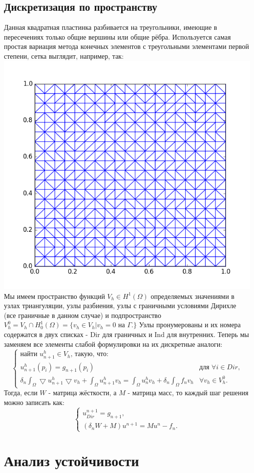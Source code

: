 \documentclass[paper=a4, fontsize=11pt]{scrartcl} %
\numberwithin{equation}{section} %
\numberwithin{figure}{section} %
\numberwithin{table}{section} %
\begin{document}
\subsection{Дискретизация по пространству}
Данная квадратная пластинка разбивается на треугольники, имеющие в пересечениях только общие вершины или общие рёбра.
Используется самая простая вариация метода конечных элементов с треугольными элементами первой степени, сетка выглядит, например, так: \\
\includegraphics[scale=0.32]{mesh} \\
Мы имеем пространство функций $V_h \in H^1(\Omega)$ определяемых значениями в узлах триангуляции, узлы разбиения, узлы с граничными условиями Дирихле (все граничные в данном случае) и подпространство $V^0_h = V_h \cap H^1_0(\Omega) = \{v_h \in V_h | v_h = 0 \text{ на $\Gamma$.}\}$ Узлы пронумерованы и их номера содержатся в двух списках - Dir для граничных и Ind для внутренних. Теперь мы заменяем все элементы слабой формулировки на их дискретные аналоги:
    \[
        \begin{cases}
            \text{найти } u^h_{n+1} \in V_h\text{, такую, что:} \\
            u^h_{n+1}(p_i) = g_{n+1}(p_i)& \text{для $\forall i \in Dir$,} \\
            \delta_n \int_{\Omega} \bigtriangledown u^h_{n+1} \bigtriangledown v_h + \int_{\Omega} u^h_{n+1}v_h = \int_{\Omega} u^h_{n}v_h + \delta_n \int_{\Omega} f_{n}v_h& \forall v_h \in V^0_h.
        \end{cases}
    \]
Тогда, если $W$ - матрица жёсткости, а $M$ - матрица масс, то каждый шаг решения можно записать как:
    \[
        \begin{cases}
            u^{n+1}_{Dir} = g_{n+1}, \\
            (\delta_n W + M) u^{n+1} = M u^n - f_n.
        \end{cases}
    \]
\section{Анализ устойчивости}
\end{document}

